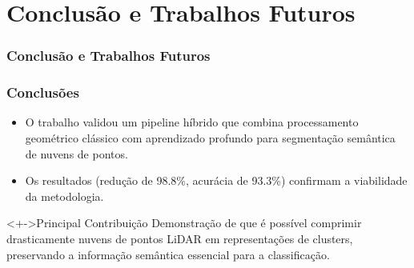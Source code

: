 \documentclass[aspectratio=169,t,xcolor=table]{beamer}
\begin{document}
\section{Conclusão e Trabalhos Futuros}

\begin{frame}
    \frametitle{Conclusão e Trabalhos Futuros}
\end{frame}

\begin{frame}
    \frametitle{Conclusões}
    \begin{itemize}
        \item<+-> O trabalho validou um pipeline híbrido que combina
              processamento geométrico clássico com aprendizado profundo para
              segmentação semântica de nuvens de pontos.
        \item<+-> Os resultados (redução de 98.8\%, acurácia de 93.3\%)
              confirmam a viabilidade da metodologia.
    \end{itemize}
    \begin{alertblock}<+->{Principal Contribuição}
        Demonstração de que é possível comprimir drasticamente nuvens de pontos
        LiDAR em representações de clusters, preservando a informação semântica
        essencial para a classificação.
    \end{alertblock}
\end{frame}
\end{document}
